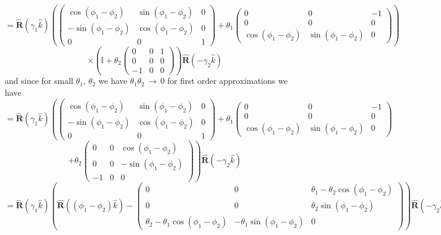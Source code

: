 \documentclass[11pt]{amsart}
\makeatletter
\newcommand{\op}[1]{\mathbf{\hat{#1}}}	%
\newcommand{\se}[1]{\mathbb{#1}}		%
\newcommand{\0}{\varnothing}		%
\DeclareMathOperator*{\goes}{\, \longrightarrow \,}		%
\newcommand{\1}{!}
\newcommand{\2}{@}
\newcommand{\3}{\#}
\newcommand{\4}{\$}
\newcommand{\5}{\%}
\newcommand{\6}{$^\wedge$}
\newcommand{\7}{\&}
\newcommand{\8}{*}
\newcommand{\9}{(}
\makeatother
\begin{document}
\[
=\op{R}\left(\gamma_1\hat{k}\right)\left(\begin{pmatrix}
\cos \left(\phi_1-\phi_2\right) & \sin\left(\phi_1-\phi_2\right) & 0
\\
-\sin \left(\phi_1-\phi_2\right) & \cos \left(\phi_1-\phi_2\right) & 0 
\\
0 & 0 & 1
\end{pmatrix}+\theta_1
\begin{pmatrix}
0 & 0 & -1
\\
0 & 0 & 0
\\
\cos \left(\phi_1-\phi_2\right) & \sin\left(\phi_1-\phi_2\right) & 0
\end{pmatrix}\right)
\]
\[
\times\left(
\se{I}+\theta_2\begin{pmatrix}
0 & 0 & 1
\\
0 & 0 & 0
\\
-1 & 0 & 0
\end{pmatrix}\right)\op{R}(-\gamma_2\hat{k})
\]
and since for small $\theta_1,\,\theta_2$ we have $\theta_1\theta_2\goes 0$ for first order approximations we have
\[
=\op{R}\left(\gamma_1\hat{k}\right)\left(\begin{pmatrix}
\cos \left(\phi_1-\phi_2\right) & \sin\left(\phi_1-\phi_2\right) & 0
\\
-\sin \left(\phi_1-\phi_2\right) & \cos \left(\phi_1-\phi_2\right) & 0 
\\
0 & 0 & 1
\end{pmatrix}+\theta_1\begin{pmatrix}
0 & 0 & -1
\\
0 & 0 & 0
\\
\cos \left(\phi_1-\phi_2\right) & \sin\left(\phi_1-\phi_2\right) & 0
\end{pmatrix}\right.
\]
\[
\left.+\theta_2\begin{pmatrix}
0 & 0 & \cos \left(\phi_1-\phi_2\right)
\\
0 & 0 & - \sin\left(\phi_1-\phi_2\right)
\\
-1 & 0 & 0
\end{pmatrix}
\right)\op{R}\left(-\gamma_2\hat{k}\right)
\]
\[
=\op{R}\left(\gamma_1\hat{k}\right)\left(\op{R}\left(\left(\phi_1-\phi_2\right)\hat{k}\right)-
\begin{pmatrix}
0	&	0	&	\theta_1-\theta_2\cos\left(\phi_1-\phi_2\right)
\\
0	& 	0	&	\theta_2\sin\left(\phi_1-\phi_2\right)
\\
\theta_2-\theta_1\cos\left(\phi_1-\phi_2\right)	&	-\theta_1\sin\left(\phi_1-\phi_2\right)	&	0
\end{pmatrix}\right)\op{R}\left(-\gamma_2\hat{k}\right)
\]
\end{document}
